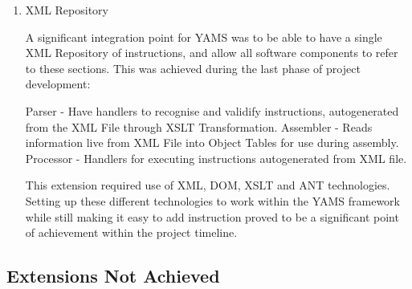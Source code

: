 \begin{enumerate}
\item XML Repository

A significant integration point for YAMS was to be able to have a single XML Repository of instructions, and allow all software components to refer to these sections. This was achieved during the last phase of project development:

Parser - Have handlers to recognise and validify instructions, autogenerated from the XML File through XSLT Transformation.
Assembler - Reads information live from XML File into Object Tables for use during assembly.
Processor - Handlers for executing instructions autogenerated from XML file.

This extension required use of XML, DOM, XSLT and ANT technologies. Setting up these different technologies to work within the YAMS framework while still making it easy to add instruction proved to be a significant point of achievement within the project timeline.

\end{enumerate}

\subsection{Extensions Not Achieved}

